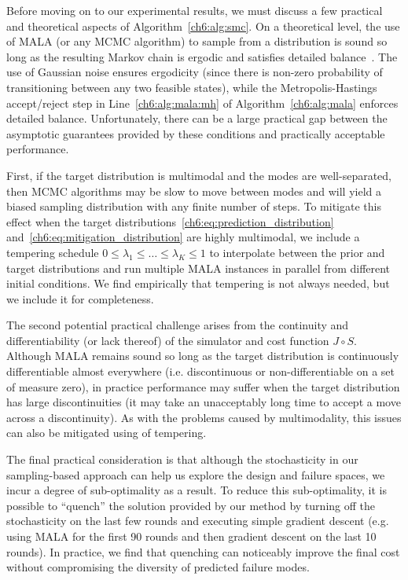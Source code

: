 Before moving on to our experimental results, we must discuss a few practical and theoretical aspects of Algorithm~\ref{ch6:alg:smc}. On a theoretical level, the use of MALA (or any MCMC algorithm) to sample from a distribution is sound so long as the resulting Markov chain is ergodic and satisfies detailed balance~\cite{aiama}. The use of Gaussian noise ensures ergodicity (since there is non-zero probability of transitioning between any two feasible states), while the Metropolis-Hastings accept/reject step in Line~\ref{ch6:alg:mala:mh} of Algorithm~\ref{ch6:alg:mala} enforces detailed balance. Unfortunately, there can be a large practical gap between the asymptotic guarantees provided by these conditions and practically acceptable performance.

First, if the target distribution is multimodal and the modes are well-separated, then MCMC algorithms may be slow to move between modes and will yield a biased sampling distribution with any finite number of steps. To mitigate this effect when the target distributions~\eqref{ch6:eq:prediction_distribution} and~\eqref{ch6:eq:mitigation_distribution} are highly multimodal, we include a tempering schedule $0 \leq \lambda_1 \leq \ldots \leq \lambda_K \leq 1$ to interpolate between the prior and target distributions and run multiple MALA instances in parallel from different initial conditions. We find empirically that tempering is not always needed, but we include it for completeness.

The second potential practical challenge arises from the continuity and differentiability (or lack thereof) of the simulator and cost function $J \circ S$. Although MALA remains sound so long as the target distribution is continuously differentiable almost everywhere (i.e. discontinuous or non-differentiable on a set of measure zero), in practice performance may suffer when the target distribution has large discontinuities (it may take an unacceptably long time to accept a move across a discontinuity). As with the problems caused by multimodality, this issues can also be mitigated using of tempering.

The final practical consideration is that although the stochasticity in our sampling-based approach can help us explore the design and failure spaces, we incur a degree of sub-optimality as a result. To reduce this sub-optimality, it is possible to ``quench'' the solution provided by our method by turning off the stochasticity on the last few rounds and executing simple gradient descent (e.g. using MALA for the first 90 rounds and then gradient descent on the last 10 rounds). In practice, we find that quenching can noticeably improve the final cost without compromising the diversity of predicted failure modes.

